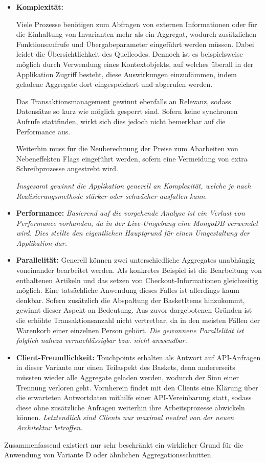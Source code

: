 \begin{itemize}[topsep=-2pt]
	\item \textbf{Komplexität: } {Viele Prozesse benötigen zum Abfragen von externen Informationen oder für die Einhaltung von Invarianten mehr als ein Aggregat, wodurch zusätzlichen Funktionsaufrufe und Übergabeparameter eingeführt werden müssen. Dabei leidet die Übersichtlichkeit des Quellcodes. Dennoch ist es beispielsweise möglich durch Verwendung eines Kontextobjekts, auf welches überall in der Applikation Zugriff besteht, diese Auswirkungen einzudämmen, indem geladene Aggregate dort eingespeichert und abgerufen werden.
		
	Das Transaktionsmanagement gewinnt ebenfalls an Relevanz, sodass Datensätze so kurz wie möglich gesperrt sind. Sofern keine synchronen Aufrufe stattfinden, wirkt sich dies jedoch nicht bemerkbar auf die Performance aus. 
	
	Weiterhin muss für die Neuberechnung der Preise zum Abarbeiten von Nebeneffekten Flags eingeführt werden, sofern eine Vermeidung von extra Schreibprozesse angestrebt wird. 
	
	\emph{Insgesamt gewinnt die Applikation generell an Komplexität, welche je nach Realisierungsmethode stärker oder schwächer ausfallen kann.}}

	\item \textbf{Performance: } { \emph{Basierend auf die vorgehende Analyse ist ein Verlust von Performance vorhanden, da in der Live-Umgebung eine MongoDB verwendet wird. Dies stellte den eigentlichen Hauptgrund für einen Umgestaltung der Applikation dar.} }
	
	\item \textbf{Parallelität: } { Generell können zwei unterschiedliche Aggregates unabhängig voneinander bearbeitet werden. Als konkretes Beispiel ist die Bearbeitung von enthaltenen Artikeln und das setzen von Checkout-Informationen gleichzeitig möglich. Eine tatsächliche Anwendung dieses Falles ist allerdings kaum denkbar. Sofern zusätzlich die Abspaltung der BasketItems hinzukommt, gewinnt dieser Aspekt an Bedeutung. Aus zuvor dargebotenen Gründen ist die erhöhte Transaktionsanzahl nicht vertretbar, da in den meisten Fällen der Warenkorb einer einzelnen Person gehört. \emph{Die gewonnene Parallelität ist folglich nahezu vernachlässigbar bzw. nicht anwendbar.}}
	\item \textbf{Client-Freundlichkeit: } { Touchpoints erhalten als Antwort auf API-Anfragen in dieser Variante nur einen Teilaspekt des Baskets, denn andererseits müssten wieder alle Aggregate geladen werden, wodurch der Sinn einer Trennung verloren geht. Vornherein findet mit den Clients eine Klärung über die erwarteten Antwortdaten mithilfe einer API-Vereinbarung statt, sodass diese ohne zusätzliche Anfragen weiterhin ihre Arbeitsprozesse abwickeln können. \emph{Letztendlich sind Clients nur maximal neutral von der neuen Architektur betroffen.}}
\end{itemize}

Zusammenfassend existiert nur sehr beschränkt ein wirklicher Grund für die Anwendung von Variante D oder ähnlichen Aggregationsschnitten.

